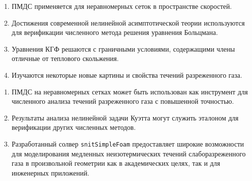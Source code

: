 {\novelty}
\begin{enumerate}
    \item ПМДС применяется для неравномерных сеток в пространстве скоростей. %
    \item Достижения современной нелинейной асимптотической теории используются
    для верификации численного метода решения уравнения Больцмана. %
    \item Уравнения КГФ решаются с граничными условиями, содержащими члены отличные от теплового скольжения. %
    \item Изучаются некоторые новые картины и свойства течений разреженного газа. %
\end{enumerate}

{\influence}
\begin{enumerate}
    \item ПМДС на неравномерных сетках может быть использован
    как инструмент для численного анализа течений разреженного газа с повышенной точностью.
    \item Результаты анализа нелинейной задачи Куэтта могут служить эталоном
    для верификации других численных методов.
    \item Разработанный солвер \verb+snitSimpleFoam+ предоставляет широкие возможности
    для моделирования медленных неизотермических течений слаборазреженного газа в произвольной геометрии
    как в академических целях, так и для инженерных приложений.
\end{enumerate}


